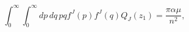 \begin{equation}
\int_{0}^{\infty }\int_{0}^{\infty }dp\,dq\,pqf^{J}(p)f^{J}(q)Q_{J}(z_{1})=%
\frac{\pi \alpha \mu }{n^{2}},
\end{equation}

